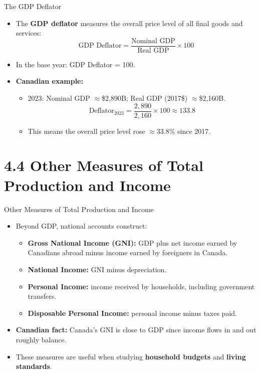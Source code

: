 \documentclass[aspectratio=169]{beamer}
\begin{document}
\begin{frame}{The GDP Deflator}
\transfade
\begin{itemize}[<+->]
  \item The \textbf{GDP deflator} measures the overall price level of all final goods and services:
  \[
    \text{GDP Deflator} = \frac{\text{Nominal GDP}}{\text{Real GDP}} \times 100
  \]
  \item In the base year: GDP Deflator = 100.
  \item \textbf{Canadian example:}
  \begin{itemize}[<+->]
    \item 2023: Nominal GDP $\approx$\$2,890B; Real GDP (2017\$) $\approx$\$2,160B.
    \[
      \text{Deflator}_{2023} = \frac{2{,}890}{2{,}160} \times 100 \approx 133.8
    \]
    \item This means the overall price level rose $\approx$33.8\% since 2017.
  \end{itemize}
\end{itemize}
\end{frame}

\section{4.4 Other Measures of Total Production and Income}

\begin{frame}{Other Measures of Total Production and Income}
\transfade
\begin{itemize}[<+->]
  \item Beyond GDP, national accounts construct:
  \begin{itemize}[<+->]
    \item \textbf{Gross National Income (GNI):} GDP plus net income earned by Canadians abroad minus income earned by foreigners in Canada.
    \item \textbf{National Income:} GNI minus depreciation.
    \item \textbf{Personal Income:} income received by households, including government transfers.
    \item \textbf{Disposable Personal Income:} personal income minus taxes paid.
  \end{itemize}
  \item \textbf{Canadian fact:} Canada's GNI is close to GDP since income flows in and out roughly balance.
  \item These measures are useful when studying \textbf{household budgets} and \textbf{living standards}.
\end{itemize}
\end{frame}
\end{document}
